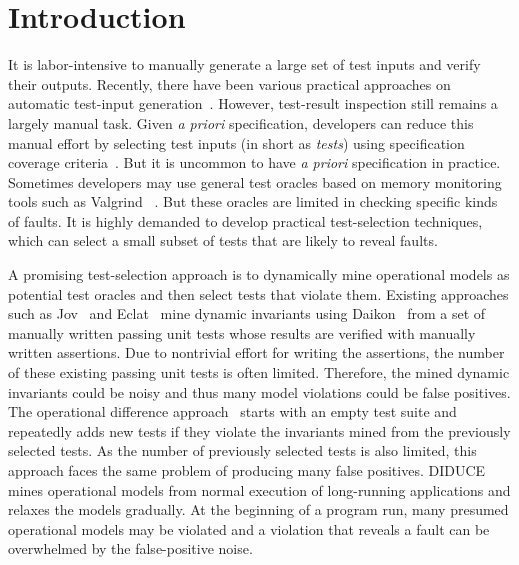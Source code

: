 \documentclass{sig-alternate}
\begin{document}



\section{Introduction} \label{sec:intro}

It is labor-intensive to manually generate a large set of test
inputs and verify their outputs. Recently, there have been various
practical approaches on automatic test-input
generation~\cite{Pacheco07, Sen05, Visser04, Wassermann08}. However,
test-result inspection still remains a largely manual task. Given
\emph{a priori} specification, developers can reduce this manual
effort by selecting test inputs (in short as \emph{tests}) using
specification coverage criteria~\cite{Chang99}. But it is uncommon
to have \emph{a priori} specification in practice. Sometimes
developers may use general test oracles based on memory monitoring
tools such as Valgrind ~\cite{Nethercote07}. But these oracles are
limited in checking specific kinds of faults. It is highly demanded
to develop practical test-selection techniques, which can select a
small subset of tests that are likely to reveal faults.


A promising test-selection approach is to dynamically mine
operational models as potential test oracles and then select tests
that violate them. Existing approaches such as Jov~\cite{Xie03} and
Eclat~\cite{Pacheco05} mine dynamic invariants using
Daikon~\cite{Ernst01} from a set of manually written passing unit
tests whose results are verified with manually written assertions.
Due to nontrivial effort for writing the assertions, the number of
these existing passing unit tests is often limited. Therefore, the
mined dynamic invariants could be noisy and thus many model
violations could be false positives. The operational difference
approach~\cite{Harder03} starts with an empty test suite and
repeatedly adds new tests if they violate the invariants mined from
the previously selected tests. As the number of previously selected
tests is also limited, this approach faces the same problem of
producing many false positives. DIDUCE~\cite{Hangal02} mines
operational models from normal execution of long-running
applications and relaxes the models gradually. At the beginning of a
program run, many presumed operational models may be violated and a
violation that reveals a fault can be overwhelmed by the
false-positive noise.
\end{document}
